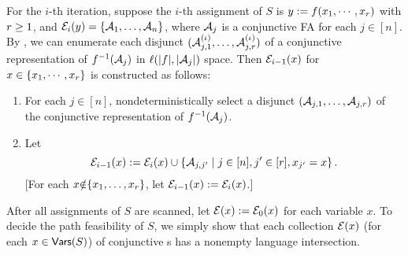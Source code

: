 
%

For the $i$-th iteration, suppose the $i$-th assignment of $S$ is $y:= f(x_1,
\cdots, x_r)$ with $r\geq 1$, and 
$\mathcal{E}_i(y)=\{\mathcal{A}_1, \ldots, \mathcal{A}_n\}$, 
where $\mathcal{A}_j$ is a conjunctive FA for each $j \in [n]$.
By \prerec{}, we can enumerate each disjunct $(\mathcal{A}^{(\iota)}_{j, 1}, \ldots, \mathcal{A}^{(\iota)}_{j, r})$ of a conjunctive representation of 
$f^{-1}(\mathcal{A}_j)$ in $\ell(|f|,|\mathcal{A}_j|)$ space.
Then $\mathcal{E}_{i-1}(x)$ for $x \in  \{x_1,\cdots, x_r\}$ is constructed as follows: %
\begin{enumerate}
\item For each $j \in [n]$, nondeterministically select a disjunct $\left(\mathcal{A}_{j, 1}, \ldots, \mathcal{A}_{j, r}\right)$ of the conjunctive representation of $f^{-1}(\mathcal{A}_j)$.
%
\item 
Let
\[
    \mathcal{E}_{i-1}(x):= \mathcal{E}_{i}(x) \cup \left\{\mathcal{A}_{j, j'} \mid  j \in [n], j' \in [r], x_{j'} = x
        \right\}.
\]
[For each $x{\notin} \{x_1,\ldots, x_r\}$, let $\mathcal{E}_{i-1}(x) := 
        \mathcal{E}_i(x)$.]
%
\end{enumerate}
%
After all assignments of $S$ are scanned,  let $\mathcal{E}(x):=\mathcal{E}_{0}(x)$ for each variable $x$.
To decide the path feasibility of $S$, we simply show that each collection
$\mathcal{E}(x)$ (for each $x \in \mathsf{Vars}(S)$) of conjunctive \FA{}s has a nonempty 
language intersection.


